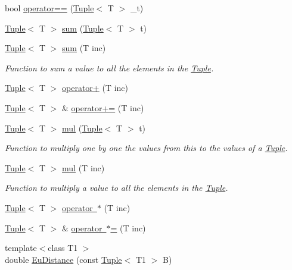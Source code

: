 \begin{DoxyCompactItemize}
bool \mbox{\hyperlink{class_tuple_ad8f90a7c0726fae5ac5651c4e16222cd}{operator==}} (\mbox{\hyperlink{class_tuple}{Tuple}}$<$ T $>$ \+\_\+t)
\item 
\mbox{\hyperlink{class_tuple}{Tuple}}$<$ T $>$ \mbox{\hyperlink{class_tuple_a2b595ce33576c6fcb36d74b46f0a7c55}{sum}} (\mbox{\hyperlink{class_tuple}{Tuple}}$<$ T $>$ t)
\item 
\mbox{\hyperlink{class_tuple}{Tuple}}$<$ T $>$ \mbox{\hyperlink{class_tuple_a20daa0804e2bac28949b5abe0cbcc589}{sum}} (T inc)
\begin{DoxyCompactList}\small\item\em Function to sum a value to all the elements in the {\ttfamily \mbox{\hyperlink{class_tuple}{Tuple}}}. \end{DoxyCompactList}\item 
\mbox{\hyperlink{class_tuple}{Tuple}}$<$ T $>$ \mbox{\hyperlink{class_tuple_af41b573429ba5d8fc0b5576b7b41e818}{operator+}} (T inc)
\item 
\mbox{\hyperlink{class_tuple}{Tuple}}$<$ T $>$ \& \mbox{\hyperlink{class_tuple_aeace0f594f48529ddf3385cb2f023daf}{operator+=}} (T inc)
\item 
\mbox{\hyperlink{class_tuple}{Tuple}}$<$ T $>$ \mbox{\hyperlink{class_tuple_aa04cadf68dd3658943db047b6fd500fa}{mul}} (\mbox{\hyperlink{class_tuple}{Tuple}}$<$ T $>$ t)
\begin{DoxyCompactList}\small\item\em Function to multiply one by one the values from this to the values of a {\ttfamily \mbox{\hyperlink{class_tuple}{Tuple}}}. \end{DoxyCompactList}\item 
\mbox{\hyperlink{class_tuple}{Tuple}}$<$ T $>$ \mbox{\hyperlink{class_tuple_ad1de2e1ba86734fb751897138707a603}{mul}} (T inc)
\begin{DoxyCompactList}\small\item\em Function to multiply a value to all the elements in the {\ttfamily \mbox{\hyperlink{class_tuple}{Tuple}}}. \end{DoxyCompactList}\item 
\mbox{\hyperlink{class_tuple}{Tuple}}$<$ T $>$ \mbox{\hyperlink{class_tuple_ab5bd095731feb7aa39bcf41778eb144f}{operator $\ast$}} (T inc)
\item 
\mbox{\hyperlink{class_tuple}{Tuple}}$<$ T $>$ \& \mbox{\hyperlink{class_tuple_a5dfd14ef6f956b608d6a99bdf0cf9c75}{operator $\ast$=}} (T inc)
\item 
{\footnotesize template$<$class T1 $>$ }\\double \mbox{\hyperlink{class_tuple_a973d6cae203bca0c1ce0d0b65279e433}{Eu\+Distance}} (const \mbox{\hyperlink{class_tuple}{Tuple}}$<$ T1 $>$ B)

\end{DoxyCompactItemize}
